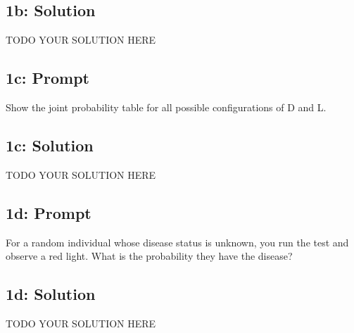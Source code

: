 \documentclass[12pt]{article}
\newcommand{\officialdirections}[1]{{\color{blue} #1}}
\begin{document}
\subsection{1b: Solution}
TODO YOUR SOLUTION HERE

\newpage

\officialdirections{
\subsection*{1c: Prompt}

Show the joint probability table for all possible configurations of D and L.
}

\subsection{1c: Solution}
TODO YOUR SOLUTION HERE

\newpage

\officialdirections{
\subsection*{1d: Prompt}

For a random individual whose disease status is unknown, you run the test and observe a red light. What is the probability they have the disease?
}

\subsection{1d: Solution}
TODO YOUR SOLUTION HERE
\end{document}

